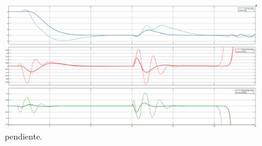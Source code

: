 \begin{figure}[H]
	\centering
	\includegraphics[width=\linewidth]{../Analisis de Resultados/ImagenesAnalisis de Resultados/disc_vs_ideal_vars.png}
	\caption{pendiente.}	
	\label{fig:disc_vs_ideal_vars}
\end{figure}


